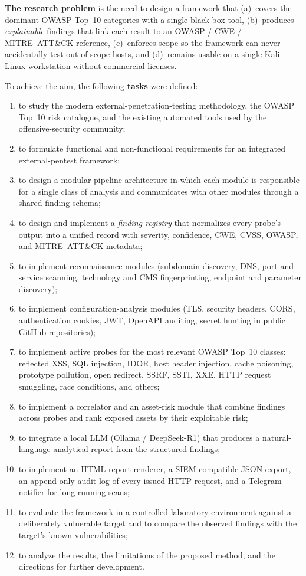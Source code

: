 \textbf{The research problem} is the need to design a framework that (a)~covers the dominant OWASP Top~10 categories with a single black-box tool, (b)~produces \textit{explainable} findings that link each result to an OWASP / CWE / MITRE~ATT\&CK reference, (c)~enforces scope so the framework can never accidentally test out-of-scope hosts, and (d)~remains usable on a single Kali-Linux workstation without commercial licenses.

To achieve the aim, the following \textbf{tasks} were defined:
\begin{enumerate}
  \item to study the modern external-penetration-testing methodology, the OWASP Top~10 risk catalogue, and the existing automated tools used by the offensive-security community;
  \item to formulate functional and non-functional requirements for an integrated external-pentest framework;
  \item to design a modular pipeline architecture in which each module is responsible for a single class of analysis and communicates with other modules through a shared finding schema;
  \item to design and implement a \textit{finding registry} that normalizes every probe's output into a unified record with severity, confidence, CWE, CVSS, OWASP, and MITRE~ATT\&CK metadata;
  \item to implement reconnaissance modules (subdomain discovery, DNS, port and service scanning, technology and CMS fingerprinting, endpoint and parameter discovery);
  \item to implement configuration-analysis modules (TLS, security headers, CORS, authentication cookies, JWT, OpenAPI auditing, secret hunting in public GitHub repositories);
  \item to implement active probes for the most relevant OWASP Top~10 classes: reflected XSS, SQL injection, IDOR, host header injection, cache poisoning, prototype pollution, open redirect, SSRF, SSTI, XXE, HTTP request smuggling, race conditions, and others;
  \item to implement a correlator and an asset-risk module that combine findings across probes and rank exposed assets by their exploitable risk;
  \item to integrate a local LLM (Ollama / DeepSeek-R1) that produces a natural-language analytical report from the structured findings;
  \item to implement an HTML report renderer, a SIEM-compatible JSON export, an append-only audit log of every issued HTTP request, and a Telegram notifier for long-running scans;
  \item to evaluate the framework in a controlled laboratory environment against a deliberately vulnerable target and to compare the observed findings with the target's known vulnerabilities;
  \item to analyze the results, the limitations of the proposed method, and the directions for further development.
\end{enumerate}

